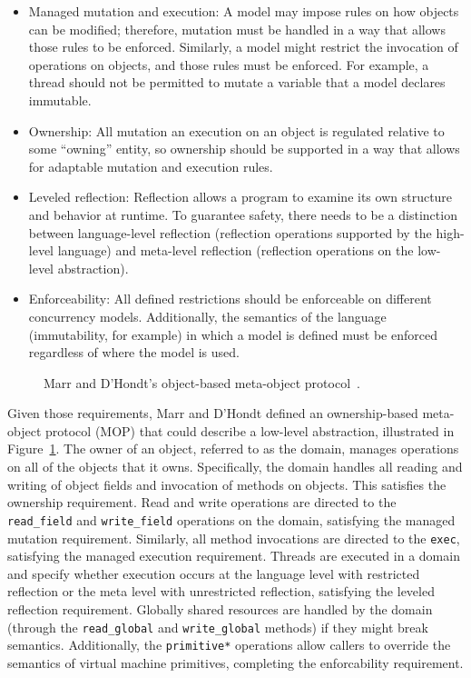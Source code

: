\documentclass{sig-alternate}
\newcommand{\code}[1]{\texttt{#1}}
\begin{document}
\begin{itemize}
  \item Managed mutation and execution: A model may impose rules on how objects can be modified; therefore, mutation must be handled in a way that allows those rules to be enforced. Similarly, a model might restrict the invocation of operations on objects, and those rules must be enforced. For example, a thread should not be permitted to mutate a variable that a model declares immutable.

  \item Ownership: All mutation an execution on an object is regulated relative to some ``owning'' entity, so ownership should be supported in a way that allows for adaptable mutation and execution rules.

  \item Leveled reflection: Reflection allows a program to examine its own structure and behavior at runtime. To guarantee safety, there needs to be a distinction between language-level reflection (reflection operations supported by the high-level language) and meta-level reflection (reflection operations on the low-level abstraction).

  \item Enforceability: All defined restrictions should be enforceable on different concurrency models. Additionally, the semantics of the language (immutability, for example) in which a model is defined must be enforced regardless of where the model is used.
\end{itemize}

\begin{figure}[ht]
  \centering
  \resizebox{0.55\linewidth}{!}{}
  \caption{Marr and D'Hondt's object-based meta-object protocol~\cite{Marr2012}.}
\label{figure:obmop}
\end{figure}

Given those requirements, Marr and D'Hondt defined an ownership-based meta-object protocol (MOP) that could describe a low-level abstraction, illustrated in Figure~\ref{figure:obmop}. The owner of an object, referred to as the domain, manages operations on all of the objects that it owns. Specifically, the domain handles all reading and writing of object fields and invocation of methods on objects. This satisfies the ownership requirement. Read and write operations are directed to the \code{read\_field} and \code{write\_field} operations on the domain, satisfying the managed mutation requirement. Similarly, all method invocations are directed to the \code{exec}, satisfying the managed execution requirement. Threads are executed in a domain and specify whether execution occurs at the language level with restricted reflection or the meta level with unrestricted reflection, satisfying the leveled reflection requirement. Globally shared resources are handled by the domain (through the \code{read\_global} and \code{write\_global} methods) if they might break semantics. Additionally, the \code{primitive*} operations allow callers to override the semantics of virtual machine primitives, completing the enforcability requirement.
\end{document}
